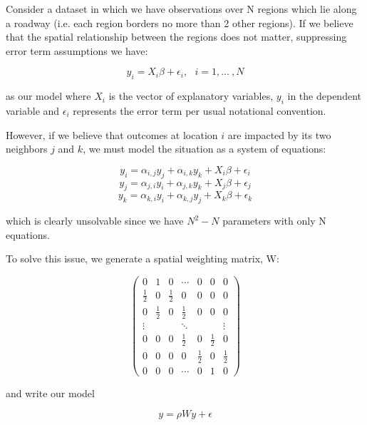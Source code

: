 \documentclass{article}
\begin{document}
Consider a dataset in which we have observations over N regions which lie along a roadway (i.e. each region borders no more than 2 other regions). If we believe that the spatial relationship between the regions does not matter, suppressing error term assumptions we have:

\begin{equation}
y_i = X_i\beta + \epsilon_i,\ \ \ i=1, ...\ ,N
\end{equation}

as our model where $X_i$ is the vector of explanatory variables, $y_i$ in the dependent variable and $\epsilon_i$ represents the error term per usual notational convention.

\newpage

However, if we believe that outcomes at location $i$ are impacted by its two neighbors $j$ and $k$, we must model the situation as a system of equations:

\begin{equation}
y_i = \alpha_{i,j}y_j + \alpha_{i,k}y_k + X_i\beta + \epsilon_i
\end{equation}
\begin{equation}
y_j = \alpha_{j,i}y_i + \alpha_{j,k}y_k + X_j\beta + \epsilon_j
\end{equation}
\begin{equation}
y_k = \alpha_{k,i}y_i + \alpha_{k,j}y_j + X_k\beta + \epsilon_k
\end{equation}

which is clearly unsolvable since we have $N^2-N$ parameters with only N equations.

To solve this issue, we generate a spatial weighting matrix, W:

$$
\begin{pmatrix}

0 & 1 & 0 & \cdots & 0 & 0 & 0\\ \frac{1}{2} & 0 & \frac{1}{2} & 0 & 0 & 0 & 0\\ 0 & \frac{1}{2} & 0 & \frac{1}{2} & 0 & 0 & 0\\ \vdots &  &  & \ddots &  &  & \vdots\\ 0 & 0 & 0 & \frac{1}{2} & 0 & \frac{1}{2} & 0 \\ 0 & 0 & 0 & 0 & \frac{1}{2} & 0 & \frac{1}{2} \\ 0 & 0 & 0 & \cdots & 0 & 1 & 0
\end{pmatrix}
$$

and write our model

\begin{equation}
y= \rho Wy+\epsilon
\end{equation}
\end{document}
